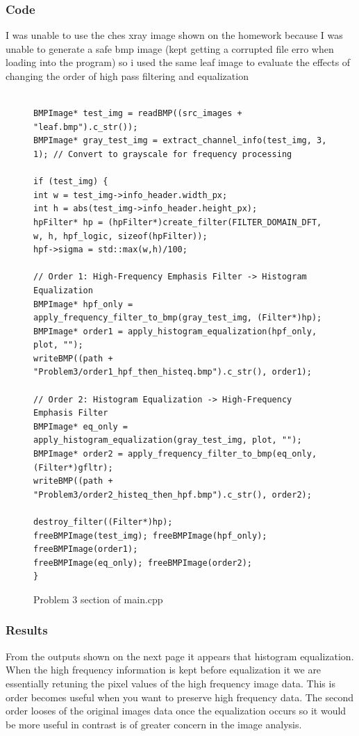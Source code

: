 \documentclass[11pt]{article}
\begin{document}
\subsubsection{Code}
I was unable to use the ches xray image shown on the homework because I was unable to generate a safe bmp image (kept getting a corrupted file erro when loading into the program) so i used the same leaf image to evaluate the effects of changing the order of high pass filtering and equalization
\begin{figure}[H]
\begin{verbatim}

BMPImage* test_img = readBMP((src_images + "leaf.bmp").c_str());
BMPImage* gray_test_img = extract_channel_info(test_img, 3, 1); // Convert to grayscale for frequency processing

if (test_img) {
int w = test_img->info_header.width_px;
int h = abs(test_img->info_header.height_px);
hpFilter* hp = (hpFilter*)create_filter(FILTER_DOMAIN_DFT, w, h, hpf_logic, sizeof(hpFilter));
hpf->sigma = std::max(w,h)/100;
	
// Order 1: High-Frequency Emphasis Filter -> Histogram Equalization
BMPImage* hpf_only = apply_frequency_filter_to_bmp(gray_test_img, (Filter*)hp);
BMPImage* order1 = apply_histogram_equalization(hpf_only, plot, "");
writeBMP((path + "Problem3/order1_hpf_then_histeq.bmp").c_str(), order1);

// Order 2: Histogram Equalization -> High-Frequency Emphasis Filter
BMPImage* eq_only = apply_histogram_equalization(gray_test_img, plot, "");
BMPImage* order2 = apply_frequency_filter_to_bmp(eq_only, (Filter*)gfltr);
writeBMP((path + "Problem3/order2_histeq_then_hpf.bmp").c_str(), order2);

destroy_filter((Filter*)hp);
freeBMPImage(test_img); freeBMPImage(hpf_only); freeBMPImage(order1);
freeBMPImage(eq_only); freeBMPImage(order2);
}
\end{verbatim}
\caption{Problem 3 section of main.cpp}
\label{figure:Extraction}
\end{figure}






\subsubsection{Results}

From the outputs shown on the next page it appears that histogram equalization. When the high frequency information is kept before equalization it we are essentially retuning the pixel values of the high frequency image data. This is order becomes useful when you want to preserve high frequency data. The second order looses of the original images data once the equalization occurs so it would be more useful in contrast is of greater concern in the image analysis.
\newpage
	 
\end{document}
